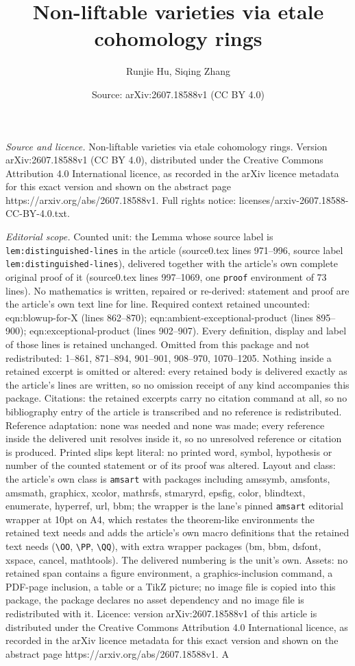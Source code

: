 \documentclass[10pt,a4paper]{amsart}
\title[Non-liftable varieties via etale cohomology rings]{Non-liftable varieties via etale cohomology rings}
\author{Runjie Hu, Siqing Zhang}
\date{Source: arXiv:2607.18588v1 (CC BY 4.0)}
\begin{document}
\maketitle

\noindent\emph{Source and licence.} Non-liftable varieties via etale cohomology rings. Version arXiv:2607.18588v1 (CC BY 4.0), distributed under the Creative Commons Attribution 4.0 International licence, as recorded in the arXiv licence metadata for this exact version and shown on the abstract page https://arxiv.org/abs/2607.18588v1. Full rights notice: licenses/arxiv-2607.18588-CC-BY-4.0.txt.\par\smallskip

\noindent\textit{Editorial scope.} Counted unit: the Lemma whose source label is \texttt{lem:distinguished-lines} in the article (source0.tex lines 971--996, source label \texttt{lem:distinguished-lines}), delivered together with the article's own complete original proof of it (source0.tex lines 997--1069, one \texttt{proof} environment of 73 lines). No mathematics is written, repaired or re-derived: statement and proof are the article's own text line for line. Required context retained uncounted: eqn:blowup-for-X (lines 862--870); eqn:ambient-exceptional-product (lines 895--900); eqn:exceptional-product (lines 902--907). Every definition, display and label of those lines is retained unchanged. Omitted from this package and not redistributed: 1--861, 871--894, 901--901, 908--970, 1070--1205. Nothing inside a retained excerpt is omitted or altered: every retained body is delivered exactly as the article's lines are written, so no omission receipt of any kind accompanies this package. Citations: the retained excerpts carry no citation command at all, so no bibliography entry of the article is transcribed and no reference is redistributed. Reference adaptation: none was needed and none was made; every reference inside the delivered unit resolves inside it, so no unresolved reference or citation is produced. Printed slips kept literal: no printed word, symbol, hypothesis or number of the counted statement or of its proof was altered. Layout and class: the article's own class is \texttt{amsart} with packages including amssymb, amsfonts, amsmath, graphicx, xcolor, mathrsfs, stmaryrd, epsfig, color, blindtext, enumerate, hyperref, url, bbm; the wrapper is the lane's pinned \texttt{amsart} editorial wrapper at 10pt on A4, which restates the theorem-like environments the retained text needs and adds the article's own macro definitions that the retained text needs (\texttt{\textbackslash OO}, \texttt{\textbackslash PP}, \texttt{\textbackslash QQ}), with extra wrapper packages (bm, bbm, dsfont, xspace, cancel, mathtools). The delivered numbering is the unit's own. Assets: no retained span contains a figure environment, a graphics-inclusion command, a PDF-page inclusion, a table or a TikZ picture; no image file is copied into this package, the package declares no asset dependency and no image file is redistributed with it. Licence: version arXiv:2607.18588v1 of this article is distributed under the Creative Commons Attribution 4.0 International licence, as recorded in the arXiv licence metadata for this exact version and shown on the abstract page https://arxiv.org/abs/2607.18588v1. A 
\end{document}
